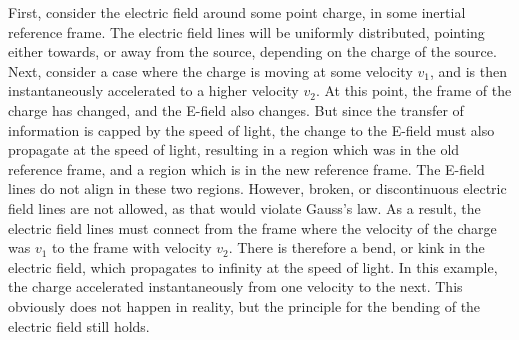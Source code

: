 \documentclass[12pt]{article}
\begin{document}
First, consider the electric field around some point charge, in some inertial reference frame. The electric field lines will be uniformly distributed, pointing either towards, or away from the source, depending on the charge of the source\cite{schroeder}. Next, consider a case where the charge is moving at some velocity $v_1$, and is then instantaneously accelerated to a higher velocity $v_2$. At this point, the frame of the charge has changed, and the E-field also changes. But since the transfer of information is capped by the speed of light, the change to the E-field must also propagate at the speed of light, resulting in a region which was in the old reference frame, and a region which is in the new reference frame. The E-field lines do not align in these two regions. However, broken, or discontinuous electric field lines are not allowed, as that would violate Gauss's law. As a result, the electric field lines must connect from the frame where the velocity of the charge was $v_1$ to the frame with velocity $v_2$. There is therefore a bend, or kink in the electric field, which propagates to infinity at the speed of light. In this example, the charge accelerated instantaneously from one velocity to the next. This obviously does not happen in reality, but the principle for the bending of the electric field still holds. 
\end{document}
